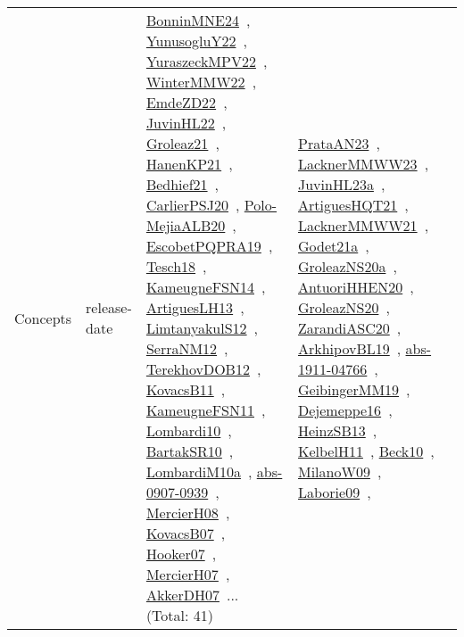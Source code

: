 {\begin{longtable}{lp{3cm}>{\raggedright\arraybackslash}p{6cm}>{\raggedright\arraybackslash}p{6cm}>{\raggedright\arraybackslash}p{8cm}}
\index{release-date}\index{Concepts!release-date}Concepts & release-date & \href{../works/BonninMNE24.pdf}{BonninMNE24}~\cite{BonninMNE24}, \href{../works/YunusogluY22.pdf}{YunusogluY22}~\cite{YunusogluY22}, \href{../works/YuraszeckMPV22.pdf}{YuraszeckMPV22}~\cite{YuraszeckMPV22}, \href{../works/WinterMMW22.pdf}{WinterMMW22}~\cite{WinterMMW22}, \href{../works/EmdeZD22.pdf}{EmdeZD22}~\cite{EmdeZD22}, \href{../works/JuvinHL22.pdf}{JuvinHL22}~\cite{JuvinHL22}, \href{../works/Groleaz21.pdf}{Groleaz21}~\cite{Groleaz21}, \href{../works/HanenKP21.pdf}{HanenKP21}~\cite{HanenKP21}, \href{../works/Bedhief21.pdf}{Bedhief21}~\cite{Bedhief21}, \href{../works/CarlierPSJ20.pdf}{CarlierPSJ20}~\cite{CarlierPSJ20}, \href{../works/Polo-MejiaALB20.pdf}{Polo-MejiaALB20}~\cite{Polo-MejiaALB20}, \href{../works/EscobetPQPRA19.pdf}{EscobetPQPRA19}~\cite{EscobetPQPRA19}, \href{../works/Tesch18.pdf}{Tesch18}~\cite{Tesch18}, \href{../works/KameugneFSN14.pdf}{KameugneFSN14}~\cite{KameugneFSN14}, \href{../works/ArtiguesLH13.pdf}{ArtiguesLH13}~\cite{ArtiguesLH13}, \href{../works/LimtanyakulS12.pdf}{LimtanyakulS12}~\cite{LimtanyakulS12}, \href{../works/SerraNM12.pdf}{SerraNM12}~\cite{SerraNM12}, \href{../works/TerekhovDOB12.pdf}{TerekhovDOB12}~\cite{TerekhovDOB12}, \href{../works/KovacsB11.pdf}{KovacsB11}~\cite{KovacsB11}, \href{../works/KameugneFSN11.pdf}{KameugneFSN11}~\cite{KameugneFSN11}, \href{../works/Lombardi10.pdf}{Lombardi10}~\cite{Lombardi10}, \href{../works/BartakSR10.pdf}{BartakSR10}~\cite{BartakSR10}, \href{../works/LombardiM10a.pdf}{LombardiM10a}~\cite{LombardiM10a}, \href{../works/abs-0907-0939.pdf}{abs-0907-0939}~\cite{abs-0907-0939}, \href{../works/MercierH08.pdf}{MercierH08}~\cite{MercierH08}, \href{../works/KovacsB07.pdf}{KovacsB07}~\cite{KovacsB07}, \href{../works/Hooker07.pdf}{Hooker07}~\cite{Hooker07}, \href{../works/MercierH07.pdf}{MercierH07}~\cite{MercierH07}, \href{../works/AkkerDH07.pdf}{AkkerDH07}~\cite{AkkerDH07}... (Total: 41) & \href{../works/PrataAN23.pdf}{PrataAN23}~\cite{PrataAN23}, \href{../works/LacknerMMWW23.pdf}{LacknerMMWW23}~\cite{LacknerMMWW23}, \href{../works/JuvinHL23a.pdf}{JuvinHL23a}~\cite{JuvinHL23a}, \href{../works/ArtiguesHQT21.pdf}{ArtiguesHQT21}~\cite{ArtiguesHQT21}, \href{../works/LacknerMMWW21.pdf}{LacknerMMWW21}~\cite{LacknerMMWW21}, \href{../works/Godet21a.pdf}{Godet21a}~\cite{Godet21a}, \href{../works/GroleazNS20a.pdf}{GroleazNS20a}~\cite{GroleazNS20a}, \href{../works/AntuoriHHEN20.pdf}{AntuoriHHEN20}~\cite{AntuoriHHEN20}, \href{../works/GroleazNS20.pdf}{GroleazNS20}~\cite{GroleazNS20}, \href{../works/ZarandiASC20.pdf}{ZarandiASC20}~\cite{ZarandiASC20}, \href{../works/ArkhipovBL19.pdf}{ArkhipovBL19}~\cite{ArkhipovBL19}, \href{../works/abs-1911-04766.pdf}{abs-1911-04766}~\cite{abs-1911-04766}, \href{../works/GeibingerMM19.pdf}{GeibingerMM19}~\cite{GeibingerMM19}, \href{../works/Dejemeppe16.pdf}{Dejemeppe16}~\cite{Dejemeppe16}, \href{../works/HeinzSB13.pdf}{HeinzSB13}~\cite{HeinzSB13}, \href{../works/KelbelH11.pdf}{KelbelH11}~\cite{KelbelH11}, \href{../works/Beck10.pdf}{Beck10}~\cite{Beck10}, \href{../works/MilanoW09.pdf}{MilanoW09}~\cite{MilanoW09}, \href{../works/Laborie09.pdf}{Laborie09}~\cite{Laborie09}, 
\end{longtable}}
